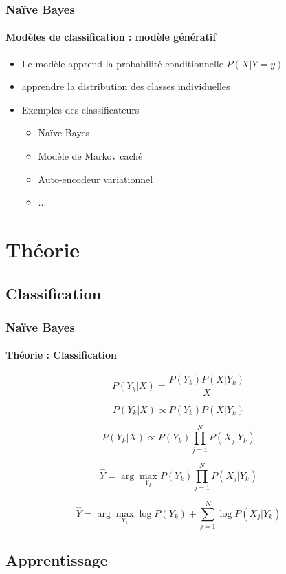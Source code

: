 \documentclass[xcolor=table]{beamer}
\begin{document}
\begin{frame}
	\frametitle{Naïve Bayes}
	\framesubtitle{Modèles de classification : modèle génératif}
	
	\begin{itemize}
		\item Le modèle apprend la probabilité conditionnelle $P(X|Y=y)$
		\item apprendre la distribution des classes individuelles
		\item Exemples des classificateurs 
		\begin{itemize}
			\item Naïve Bayes
			\item Modèle de Markov caché
			\item Auto-encodeur variationnel
			\item ...
		\end{itemize}
	\end{itemize}
	
\end{frame}

\section{Théorie}

\subsection{Classification}

\begin{frame}
	\frametitle{Naïve Bayes}
	\framesubtitle{Théorie : Classification}
	
	\[P(Y_k|X) = \frac{P(Y_k) P(X|Y_k)}{X}\]
	
	\[P(Y_k|X) \propto P(Y_k) P(X|Y_k)\]
	
	\[P(Y_k|X) \propto P(Y_k) \prod_{j=1}^{N} P(X_j|Y_k)\]
	
	\[\hat{Y} = \arg\max_{Y_k} P(Y_k) \prod_{j=1}^{N} P(X_j|Y_k)\]
	
	\[\hat{Y} = \arg\max_{Y_k} \log P(Y_k) + \sum_{j=1}^{N} \log P(X_j|Y_k)\]
	
\end{frame}

\subsection{Apprentissage}
\end{document}
